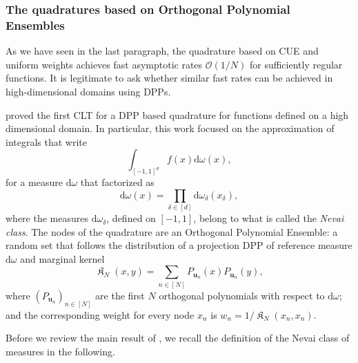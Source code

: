 \documentclass[twoside,11pt]{book}
\DeclareMathOperator*{\KDPP}{\mathfrak{K}}
\begin{document}
\subsubsection{The quadratures based on Orthogonal Polynomial Ensembles}
As we have seen in the last paragraph, the quadrature based on CUE and uniform weights achieves fast asymptotic rates $\mathcal{O}(1/N)$ for sufficiently regular functions. It is legitimate to ask whether similar fast rates can be achieved in high-dimensional domains using DPPs.



\cite{BaHa16} proved the first CLT for a DPP based quadrature for functions defined on a high dimensional domain. In particular,  this work focused on the approximation of integrals that write
\begin{equation}
\int_{[-1,1]^{d}} f(x) \mathrm{d}\omega(x),
\end{equation}
for a measure $\mathrm{d}\omega$ that  factorized as
\begin{equation}
\mathrm{d}\omega(x) = \prod\limits_{\delta \in [d]} \mathrm{d}\omega_{\delta}(x_{\delta}),
\end{equation}
where the measures $\mathrm{d}\omega_{\delta}$, defined on $[-1,1]$, belong to what is called the \emph{Nevai class}. The nodes of the quadrature are an Orthogonal Polynomial Ensemble: a random set that follows the distribution of a projection DPP of reference measure $\mathrm{d}\omega$ and marginal kernel
\begin{equation}
\KDPP_{N}(x,y) = \sum\limits_{n \in [N]} P_{\bm{u}_{n}}(x)P_{\bm{u}_{n}}(y),
\end{equation}
where $(P_{\bm{u}_{n}})_{n \in [N]}$ are the first $N$ orthogonal polynomials with respect to $\mathrm{d}\omega$; and the corresponding weight for every node $x_{n}$ is $\displaystyle w_{n} =1/\KDPP_{N}(x_{n},x_{n})$.

Before we review the main result of \citep{BaHa16}, we recall the definition of the Nevai class of measures in the following.
\end{document}
